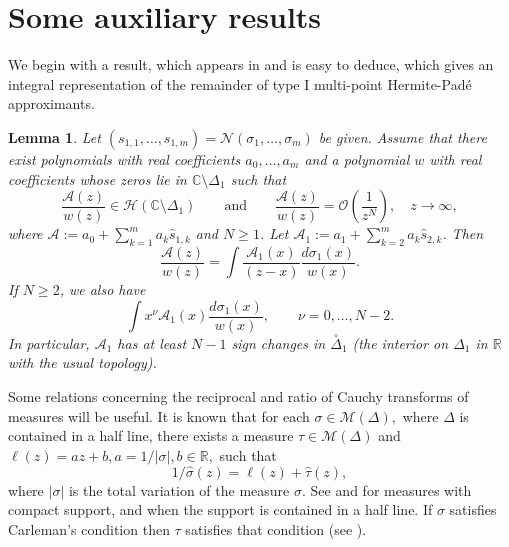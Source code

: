 \documentclass[10pt,a4paper]{article}
\newtheorem{lemma}[theorem]{Lemma}
\theoremstyle{definition}
\theoremstyle{remark}
\numberwithin{equation}{section}
\begin{document}
\section{Some auxiliary results} \label{aux}



We begin with a result, which appears in \cite[Lemma 2.1]{LM} and is easy to deduce, which  gives an integral representation of the remainder of type I multi-point  Hermite-Pad\'e approximants.

\begin{lemma} \label{reduc} Let $(s_{1,1},\ldots,s_{1,m}) = \mathcal{N}(\sigma_1,\ldots,\sigma_m)$ be given. Assume that there exist polynomials with real coefficients $a_0,\ldots,a_m$ and a polynomial $w$ with real coefficients whose zeros lie in $\mathbb{C} \setminus \Delta_1$  such that
\[\frac{\mathcal{A}(z)}{w(z)} \in \mathcal{H}(\mathbb{C} \setminus \Delta_1)\qquad \mbox{and} \qquad \frac{\mathcal{A}(z)}{w(z)} = \mathcal{O}\left(\frac{1}{z^N}\right), \quad z \to \infty,
\]
where $\mathcal{A}  := a_0 + \sum_{k=1}^m a_k  \widehat{s}_{1,k} $ and $N \geq 1$. Let $\mathcal{A}_1  := a_1 + \sum_{k=2}^m a_k  \widehat{s}_{2,k} $. Then
\begin{equation} \label{eq:3}
\frac{\mathcal{A}(z)}{w(z)} = \int \frac{\mathcal{A}_1(x)}{(z-x)} \frac{d\sigma_1(x)}{w(x)}.
\end{equation}
If $N \geq 2$, we also have
\begin{equation} \label{eq:4}
\int x^{\nu}  \mathcal{A}_1(x)  \frac{d\sigma_1(x)}{w(x)}, \qquad \nu = 0,\ldots, N -2.
\end{equation}
In particular, $\mathcal{A}_1$ has at least $N -1$ sign changes in  $\stackrel{\circ}{\Delta}_1 $ (the interior on $\Delta_1$ in $\mathbb{R}$ with the usual topology).
\end{lemma}


Some relations concerning the reciprocal and ratio of Cauchy transforms of measures will be useful.
It is  known that for each $\sigma
\in {\mathcal{M}}(\Delta),$ where $\Delta$ is contained in a half line, there exists a measure $\tau \in
{\mathcal{M}}(\Delta)$ and ${\ell}(z)=a z+b, a = 1/|\sigma|, b \in {\mathbb{R}},$ such that
\begin{equation} \label{s22}
{1}/{\widehat{\sigma}(z)}={\ell}(z)+ \widehat{\tau}(z),
\end{equation}
where $|\sigma|$ is the total variation of the measure $\sigma.$  See  \cite[Appendix]{KN} and \cite[Theorem 6.3.5]{stto} for measures with compact support, and \cite[Lemma 2.3]{FL4} when the support is contained in a half line. If $\sigma$ satisfies Carleman's condition then $\tau$ satisfies that condition (see \cite[Theorem 1.5]{LM}).
\end{document}
